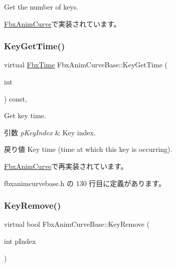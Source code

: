 Get the number of keys. 



\hyperlink{class_fbx_anim_curve_a08de74d6ef6469be37abd1df0836eac9}{Fbx\+Anim\+Curve}で実装されています。

\mbox{\label{class_fbx_anim_curve_base_a9db34dd56ce9822d0d6723ce7d50c4a3}} 
\subsubsection{\texorpdfstring{Key\+Get\+Time()}{KeyGetTime()}}
{\footnotesize\ttfamily virtual \hyperlink{class_fbx_time}{Fbx\+Time} Fbx\+Anim\+Curve\+Base\+::\+Key\+Get\+Time (\begin{DoxyParamCaption}\item[{int}]{ }\end{DoxyParamCaption}) const\hspace{0.3cm}{\ttfamily [inline]}, {\ttfamily [virtual]}}

Get key time. 
\begin{DoxyParams}{引数}
{\em p\+Key\+Index} & Key index. \\
\hline
\end{DoxyParams}
\begin{DoxyReturn}{戻り値}
Key time (time at which this key is occurring). 
\end{DoxyReturn}


\hyperlink{class_fbx_anim_curve_a547f7842ea7bae5b5ed048d15b8b0d07}{Fbx\+Anim\+Curve}で再実装されています。



 fbxanimcurvebase.\+h の 130 行目に定義があります。

\mbox{\label{class_fbx_anim_curve_base_a4d7d1bbd3d40020469aafd7c023f80d5}} 
\subsubsection{\texorpdfstring{Key\+Remove()}{KeyRemove()}\hspace{0.1cm}{\footnotesize\ttfamily [1/2]}}
{\footnotesize\ttfamily virtual bool Fbx\+Anim\+Curve\+Base\+::\+Key\+Remove (\begin{DoxyParamCaption}\item[{int}]{p\+Index }\end{DoxyParamCaption})\hspace{0.3cm}{\ttfamily [pure virtual]}}

